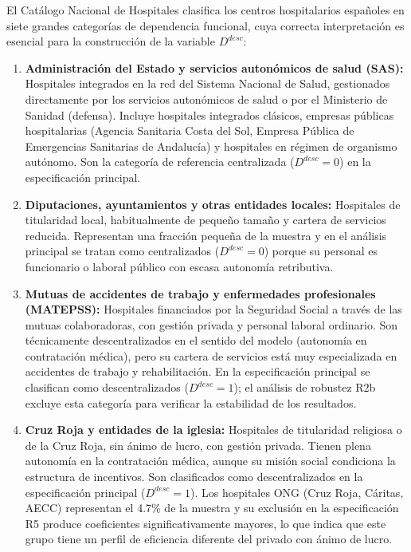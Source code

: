El Catálogo Nacional de Hospitales clasifica los centros hospitalarios españoles en siete grandes categorías de dependencia funcional, cuya correcta interpretación es esencial para la construcción de la variable $D^{desc}$:

\begin{enumerate}[label=(\roman*)]
  \item \textbf{Administración del Estado y servicios autonómicos de salud (SAS):} Hospitales integrados en la red del Sistema Nacional de Salud, gestionados directamente por los servicios autonómicos de salud o por el Ministerio de Sanidad (defensa). Incluye hospitales integrados clásicos, empresas públicas hospitalarias (Agencia Sanitaria Costa del Sol, Empresa Pública de Emergencias Sanitarias de Andalucía) y hospitales en régimen de organismo autónomo. Son la categoría de referencia centralizada ($D^{desc}=0$) en la especificación principal.

  \item \textbf{Diputaciones, ayuntamientos y otras entidades locales:} Hospitales de titularidad local, habitualmente de pequeño tamaño y cartera de servicios reducida. Representan una fracción pequeña de la muestra y en el análisis principal se tratan como centralizados ($D^{desc}=0$) porque su personal es funcionario o laboral público con escasa autonomía retributiva.

  \item \textbf{Mutuas de accidentes de trabajo y enfermedades profesionales (MATEPSS):} Hospitales financiados por la Seguridad Social a través de las mutuas colaboradoras, con gestión privada y personal laboral ordinario. Son técnicamente descentralizados en el sentido del modelo (autonomía en contratación médica), pero su cartera de servicios está muy especializada en accidentes de trabajo y rehabilitación. En la especificación principal se clasifican como descentralizados ($D^{desc}=1$); el análisis de robustez R2b excluye esta categoría para verificar la estabilidad de los resultados.

  \item \textbf{Cruz Roja y entidades de la iglesia:} Hospitales de titularidad religiosa o de la Cruz Roja, sin ánimo de lucro, con gestión privada. Tienen plena autonomía en la contratación médica, aunque su misión social condiciona la estructura de incentivos. Son clasificados como descentralizados en la especificación principal ($D^{desc}=1$). Los hospitales ONG (Cruz Roja, Cáritas, AECC) representan el 4.7\% de la muestra y su exclusión en la especificación R5 produce coeficientes significativamente mayores, lo que indica que este grupo tiene un perfil de eficiencia diferente del privado con ánimo de lucro.


\end{enumerate}
